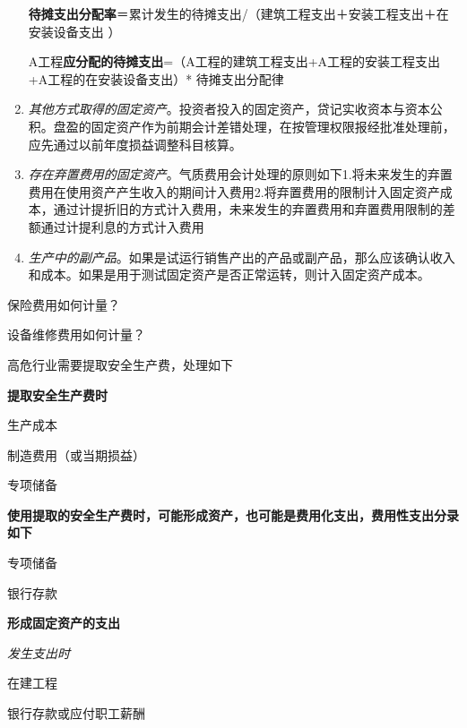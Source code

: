 \documentclass[UTF8,12pt]{ctexart}
\newenvironment{Dr}{%
	\begin{list}{}%
		{
			\setlength{\leftmargin}{2em}
			\setlength{\labelwidth}{2em}
			\setlength{\labelsep}{0pt}
			\setlength{\itemindent}{0pt}
			\setlength{\listparindent}{0pt}
			\setlength{\parsep}{0pt}
			\setlength{\topsep}{0pt}
		}
		\item[\textbf{借：}]
	}{%
	\end{list}
}
\newenvironment{Cr}{%
	\begin{list}{}%
		{
			\setlength{\leftmargin}{2em}
			\setlength{\labelwidth}{2em}
			\setlength{\labelsep}{0pt}
			\setlength{\itemindent}{0pt}
			\setlength{\listparindent}{0pt}
			\setlength{\parsep}{0pt}
			\setlength{\topsep}{0pt}
		}
		\item[\textbf{贷：}]
	}{%
	\end{list}
}
\numberwithin{equation}{section} %
\numberwithin{figure}{section}
\numberwithin{table}{section}
\begin{document}
\begin{enumerate}
		\textbf{待摊支出分配率}＝累计发生的待摊支出/（建筑工程支出＋安装工程支出＋在安装设备支出 ）
		
		A工程\textbf{应分配的待摊支出}=（A工程的建筑工程支出+A工程的安装工程支出+A工程的在安装设备支出）* 待摊支出分配律
		
		
		\item \textit{其他方式取得的固定资产}。投资者投入的固定资产，贷记实收资本与资本公积。盘盈的固定资产作为前期会计差错处理，在按管理权限报经批准处理前，应先通过以前年度损益调整科目核算。
		
		\item \textit{存在弃置费用的固定资产}。气质费用会计处理的原则如下1.将未来发生的弃置费用在使用资产产生收入的期间计入费用2.将弃置费用的限制计入固定资产成本，通过计提折旧的方式计入费用，未来发生的弃置费用和弃置费用限制的差额通过计提利息的方式计入费用
		
		
		
		\item \textit{生产中的副产品}。如果是试运行销售产出的产品或副产品，那么应该确认收入和成本。如果是用于测试固定资产是否正常运转，则计入固定资产成本。
		
	\end{enumerate}
	
	保险费用如何计量？
	
	设备维修费用如何计量？
	
	高危行业需要提取安全生产费，处理如下
	
	\textbf{提取安全生产费时}
	
	\begin{Dr}
		生产成本
		
		制造费用（或当期损益）
	\end{Dr}
	\begin{Cr}
		专项储备
	\end{Cr}
	
	
	\textbf{使用提取的安全生产费时，可能形成资产，也可能是费用化支出，费用性支出分录如下}
	
	\begin{Dr}
		专项储备
	\end{Dr}
	\begin{Cr}
		银行存款
	\end{Cr}
	
	\textbf{形成固定资产的支出}
	
	\textit{发生支出时}
	
	\begin{Dr}
		在建工程
	\end{Dr}
	\begin{Cr}
		银行存款或应付职工薪酬
	\end{Cr}
	
\end{document}
